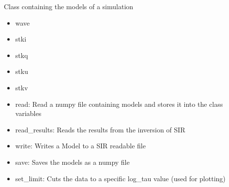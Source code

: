 \documentclass[letterpaper,10pt,english]{sphinxmanual}
\begin{document}
\begin{fulllineitems}
\label{\detokenize{classes:profile_stk.Profile}}
\pysigstartsignatures
{}
\pysigstopsignatures
\sphinxAtStartPar
Class containing the models of a simulation
\begin{description}
\begin{itemize}
\item {} 
\sphinxAtStartPar
wave

\item {} 
\sphinxAtStartPar
stki

\item {} 
\sphinxAtStartPar
stkq

\item {} 
\sphinxAtStartPar
stku

\item {} 
\sphinxAtStartPar
stkv

\end{itemize}

\begin{itemize}
\item {} 
\sphinxAtStartPar
read: Read a numpy file containing models and stores it into the class variables

\item {} 
\sphinxAtStartPar
read\_results: Reads the results from the inversion of SIR

\item {} 
\sphinxAtStartPar
write: Writes a Model to a SIR readable file

\item {} 
\sphinxAtStartPar
save: Saves the models as a numpy file

\item {} 
\sphinxAtStartPar
set\_limit: Cuts the data to a specific log\_tau value (used for plotting)

\end{itemize}

\end{description}


\end{fulllineitems}
\end{document}
